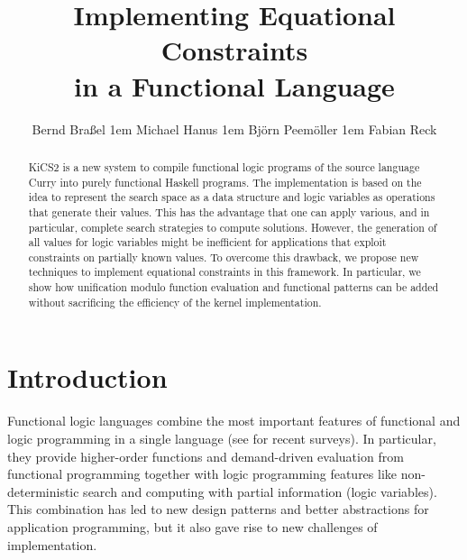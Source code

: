 \documentclass{llncs}
\begin{document}
\pagestyle{plain}
\sloppy

\title{Implementing Equational Constraints\\ in a Functional Language}

\author{
Bernd Bra{\ss}el
\kern1em
Michael Hanus
\kern1em
Bj{\"o}rn Peem{\"o}ller
\kern1em
Fabian Reck
}

\maketitle

\begin{abstract}
KiCS2 is a new system
to compile functional logic programs of the source language Curry
into purely functional Haskell programs.
The implementation is based on the idea to represent
the search space as a data structure and logic variables
as operations that generate their values.
This has the advantage that one can apply various,
and in particular, complete search strategies to compute solutions.
However, the generation of all values for logic variables
might be inefficient for applications that
exploit constraints on partially known values.
To overcome this drawback, we propose new techniques
to implement equational constraints in this framework.
In particular, we show how unification modulo function evaluation
and functional patterns can be added without sacrificing
the efficiency of the kernel implementation.
\end{abstract}


\section{Introduction}
\label{sec:Introduction}

Functional logic languages combine the most important
features of functional and logic programming in a single language
(see \cite{AntoyHanus10CACM,Hanus07ICLP} for recent surveys).
In particular, they provide higher-order functions and demand-driven
evaluation from functional programming together with logic programming features
like non-deterministic search and computing with partial information
(logic variables).
This combination
has led to new design patterns \cite{AntoyHanus02FLOPS,AntoyHanus11WFLP}
and better abstractions for application programming, but it also gave rise
to new challenges of implementation.
\end{document}
